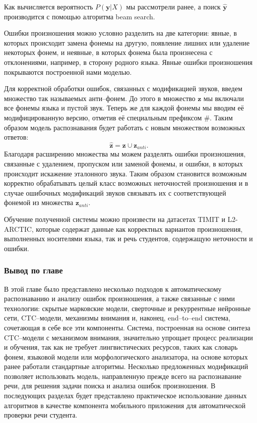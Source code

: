 Как вычисляется вероятность $P(\mathbf{y}| X)$ мы рассмотрели ранее, а поиск $\hat{\mathbf{y}}$ производится с помощью алгоритма beam search\cite{wiki:Beam_search, watanabe2017hybrid}.

Ошибки произношения можно условно разделить на две категории: явные, в которых происходит замена фонемы на другую, появление лишних или удаление некоторых фонем, и неявные, в которых фонема была произнесена с отклонениями, например, в сторону родного языка. Явные ошибки произношения покрываются построенной нами моделью. 

Для корректной обработки ошибок, связанных с модификацией звуков, введем множество так называемых анти--фонем\cite{yan2020end}. До этого в множество $\mathbf{z}$ мы включали все фонемы языка и пустой звук. Теперь же для каждой фонемы мы вводим её модифицированную версию, отметив её специальным префиксом \#. Таким образом модель распознавания будет работать с новым множеством возможных ответов:
$$\hat{\mathbf{z}} = \mathbf{z} \cup \mathbf{z}_{anti}.$$
Благодаря расширению множества мы можем разделять ошибки произношения, связанные с удалением, пропуском или заменой фонемы, и ошибки, в которых происходит искажение эталонного звука. Таким образом становится возможным корректно обрабатывать целый класс возможных неточностей произношения и в случае ошибочных модификаций звуков связывать их с соответствующей фонемой из множества $\mathbf{z}_{anti}$.

Обучение полученной системы можно произвести на датасетах TIMIT\cite{garofolo1993darpa} и L2-ARCTIC\cite{zhao2018l2}, которые содержат данные как корректных вариантов произношения, выполненных носителями языка, так и речь студентов, содержащую неточности и ошибки.

\subsubsection{Вывод по главе}
В этой главе было представлено несколько подходов к автоматическому распознаванию и анализу ошибок произношения, а также связанные с ними технологии: скрытые марковские модели, сверточные и рекуррентные нейронные сети, CTC--модели, механизмы внимания и, наконец, end--to--end система, сочетающая в себе все эти компоненты. Система, построенная на основе синтеза CTC--модели с механизмом внимания, значительно упрощает процесс реализации и обучения, так как не требует лингвистических ресурсов, таких как словарь фонем, языковой модели или морфологического анализатора, на основе которых ранее работали стандартные алгоритмы. Несколько предложенных модификаций позволяет использовать модель, направленную прежде всего на распознавание речи, для решения задачи поиска и анализа ошибок произношения. В последующих разделах будет представлено практическое использование данных алгоритмов в качестве компонента мобильного приложения для автоматической проверки речи студента.
